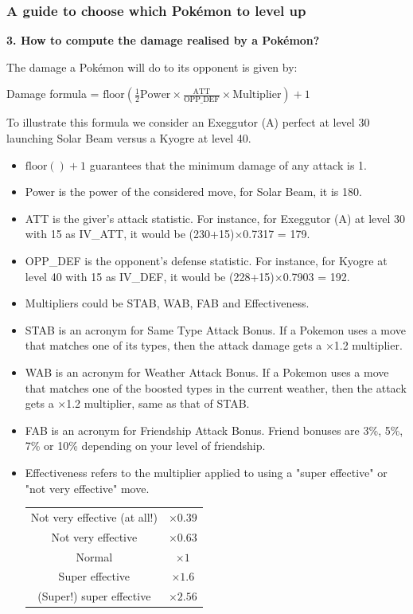 \documentclass[8pt,aspectratio=169,compress]{beamer}
\begin{document}
\begin{frame}
\frametitle{A guide to choose which Pok\'emon to level up}

\begin{block}{}
\begin{tiny}

\textbf{3. How to compute the damage realised by a Pokémon?}

The damage a Pok\'emon will do to its opponent is given by:
\begin{center}
Damage formula = $\text{floor}\left(\frac{1}{2}\text{Power} \times \frac{\text{ATT}}{\text{OPP\_DEF}}\times\text{Multiplier}\right) +1$
\end{center}

To illustrate this formula we consider an Exeggutor (A) perfect at level 30 launching Solar Beam versus a Kyogre at level 40.
\begin{itemize}
  \item $\text{floor}\left(\right)+1$ guarantees that the minimum damage of any attack is 1.
  \item Power is the power of the considered move, for Solar Beam, it is 180.
  \item ATT is the giver's attack statistic. For instance, for Exeggutor (A) at level 30 with 15 as IV\_ATT, it would be (230+15)$\times$0.7317 = 179.
  \item OPP\_DEF is the opponent's defense statistic. For instance, for Kyogre at level 40 with 15 as IV\_DEF, it would be (228+15)$\times$0.7903 = 192.
  \item Multipliers could be STAB, WAB, FAB and Effectiveness.
  \item STAB is an acronym for Same Type Attack Bonus. If a Pokemon uses a move that matches one of its types, then the attack damage gets a $\times$1.2 multiplier.
  \item WAB is an acronym for Weather Attack Bonus. If a Pokemon uses a move that matches one of the boosted types in the current weather, then the attack gets a $\times$1.2 multiplier, same as that of STAB.
  \item FAB is an acronym for Friendship Attack Bonus. Friend bonuses are 3\%, 5\%, 7\% or 10\% depending on your level of friendship.
  \item Effectiveness refers to the multiplier applied to using a "super effective" or "not very effective" move.  

\begin{center}
\begin{tabular}{cc}
Not very effective (at all!) & $\times 0.39$ \\
Not very effective & $\times 0.63$ \\
Normal & $\times 1$ \\
Super effective & $\times 1.6$  \\ 
(Super!) super effective & $\times 2.56$ \\
\end{tabular} 
\end{center}
\end{itemize}


\end{tiny}
\end{block}
\end{frame}
\end{document}
